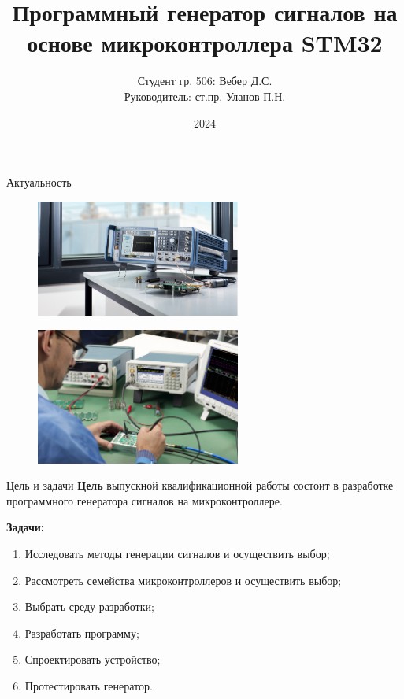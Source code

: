 \documentclass[10pt]{beamer}
\begin{document}
\title{Программный генератор сигналов на основе микроконтроллера STM32}
\author{Студент гр. 506: Вебер Д.С.\\Руководитель:  ст.пр. Уланов П.Н.}
\date{2024}


\frame{\titlepage}

\begin{frame}{Актуальность}
  \begin{figure}
  \includegraphics[width=0.6\textwidth]{actual1}
  \end{figure}
  
  \begin{figure}
  \includegraphics[width=0.6\textwidth]{actual2}
  \end{figure}
\end{frame}

\begin{frame}{Цель и задачи}
  \textbf{Цель} выпускной квалификационной работы состоит в разработке программного генератора сигналов на микроконтроллере.

  \textbf{Задачи:} 
	\begin{enumerate}
		\item Исследовать методы генерации сигналов и осуществить выбор;
		\item Рассмотреть семейства микроконтроллеров и осуществить выбор;
		\item Выбрать среду разработки;
		\item Разработать программу;
		\item Спроектировать устройство;
		\item Протестировать генератор.
	\end{enumerate}
\end{frame}
\end{document}
